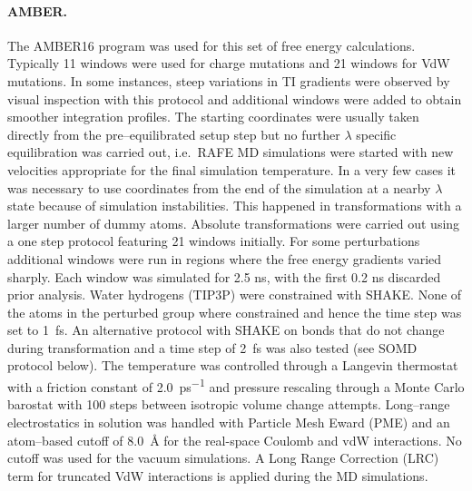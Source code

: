 \documentclass[journal=jctcce,manuscript=article]{achemso}
\begin{document}
\paragraph{AMBER.}
The AMBER16 program was used for this set of free energy calculations.
%
Typically 11 windows were used for charge mutations and 21 windows for VdW mutations.
In some instances, steep variations in TI gradients were observed by visual inspection with this protocol and additional windows were added to obtain smoother integration profiles.
The starting coordinates were usually taken directly from the pre--equilibrated setup step but no further $\lambda$ specific equilibration  was carried out,
i.e.\ RAFE MD simulations were started with new velocities appropriate for the final simulation temperature.
In a very few cases it was necessary to use coordinates from the end of the simulation at a nearby $\lambda$ state because of simulation instabilities.
This happened in transformations with a larger number of dummy atoms.
Absolute transformations were carried out using a one step protocol featuring 21 windows initially.
For some perturbations additional windows were run in regions where the free energy gradients varied sharply.
Each window was simulated for 2.5 ns, with the first 0.2 ns discarded prior analysis.
%
Water hydrogens (TIP3P) were constrained with SHAKE.
None of the atoms in the perturbed group where constrained and hence the time step was set to \SI{1}{fs}.
An alternative protocol with SHAKE on bonds that do not change during transformation and a time step of \SI{2}{fs} was also tested (see SOMD protocol below).
%
The temperature was controlled through a Langevin thermostat with a friction constant of \SI{2.0}{ps^{-1}} and pressure
rescaling through a Monte Carlo barostat with 100 steps between isotropic volume change attempts.
%
Long--range electrostatics in solution was handled with Particle Mesh Eward (PME) and an atom--based cutoff
of \SI{8.0}{\angstrom} for the real-space Coulomb and vdW interactions.
No cutoff was used for the vacuum simulations.
%
A Long Range Correction (LRC) term for truncated VdW interactions is applied during the MD simulations.
%
\end{document}
